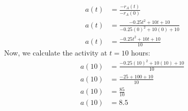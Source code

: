 \documentclass[journal,12pt,twocolumn]{IEEEtran}
\theoremstyle{remark}
\begin{document}
\begin{align}
a(t) &= \frac{-r_A(t)}{-r_A(0)} \\
 a(t) &= \frac{-0.25t^2 + 10t + 10}{-0.25(0)^2 + 10(0) + 10}\\ 
a(t) &= \frac{-0.25t^2 + 10t + 10}{10} 
\end{align}
Now, we calculate the activity at $t = 10$ hours:\\
\begin{align}
a(10) &= \frac{-0.25(10)^2 + 10(10) + 10}{10} \\
a(10) &= \frac{-25 + 100 + 10}{10} \\
a(10) &= \frac{85}{10} \\
 a(10) &= 8.5
\end{align}
\end{document}
